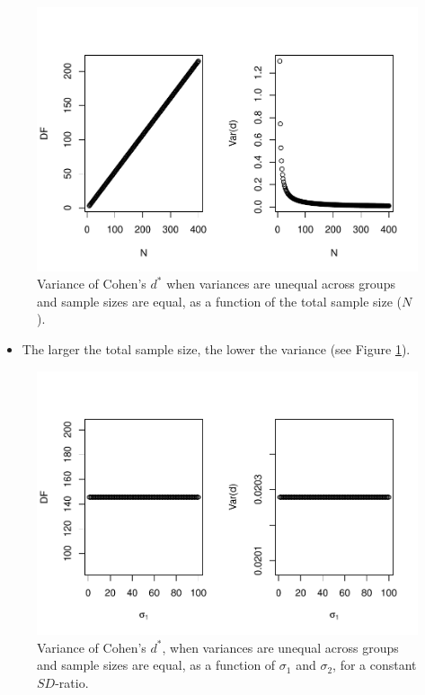 \documentclass[
  english,
  man,mask]{apa6}
\providecommand{\tightlist}{%
  \setlength{\itemsep}{0pt}\setlength{\parskip}{0pt}}
\begin{document}
\begin{figure}
\centering
\includegraphics{SupMat1_files/figure-latex/varcohendprimehetbalNsize2-1.pdf}
\caption{\label{fig:varcohendprimehetbalNsize2}Variance of Cohen's \(d^*\) when variances are unequal across groups and sample sizes are equal, as a function of the total sample size (\(N\)).}
\end{figure}

\begin{itemize}
\tightlist
\item
  The larger the total sample size, the lower the variance (see Figure \ref{fig:varcohendprimehetbalNsize2}).
\end{itemize}

\begin{figure}
\centering
\includegraphics{SupMat1_files/figure-latex/varcohendprimehetbalvariance2-1.pdf}
\caption{\label{fig:varcohendprimehetbalvariance2}Variance of Cohen's \(d^*\), when variances are unequal across groups and sample sizes are equal, as a function of \(\sigma_1\) and \(\sigma_2\), for a constant \(SD\)-ratio.}
\end{figure}
\end{document}
